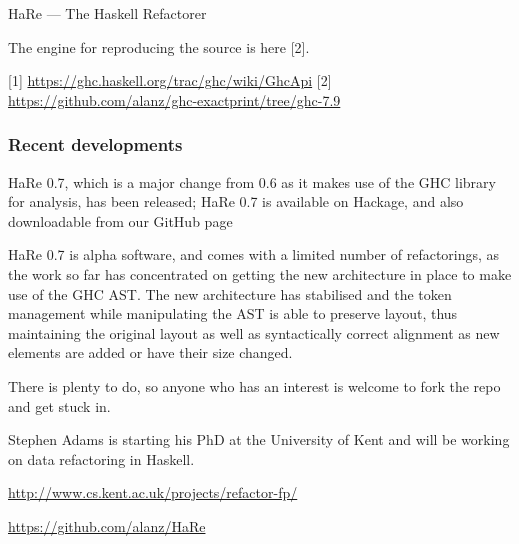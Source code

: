 \begin{hcarentry}[updated]{HaRe --- The Haskell Refactorer}
\begin{compactitem}
\end{compactitem}

The engine for reproducing the source is here [2].

[1] \url{https://ghc.haskell.org/trac/ghc/wiki/GhcApi}
[2] \url{https://github.com/alanz/ghc-exactprint/tree/ghc-7.9}

\subsubsection*{Recent developments}
\begin{compactitem}

\item HaRe 0.7, which is a major change from 0.6 as it makes use of
  the GHC library for analysis, has been released; HaRe 0.7 is
  available on Hackage, and also downloadable from our GitHub page

\item HaRe 0.7 is alpha software, and comes with a limited number of
  refactorings, as the work so far has concentrated on getting the new
  architecture in place to make use of the GHC AST. The new
  architecture has stabilised and the token management while
  manipulating the AST is able to preserve layout, thus maintaining
  the original layout as well as syntactically correct alignment as
  new elements are added or have their size changed.

\item There is plenty to do, so anyone who has an interest is welcome
  to fork the repo and get stuck in.
\item Stephen Adams is starting his PhD at the University of Kent and
  will be working on data refactoring in Haskell.
\end{compactitem}

\FurtherReading
\begin{compactitem}
\item \url{http://www.cs.kent.ac.uk/projects/refactor-fp/}
\item \url{https://github.com/alanz/HaRe}
\end{compactitem}
\end{hcarentry}
